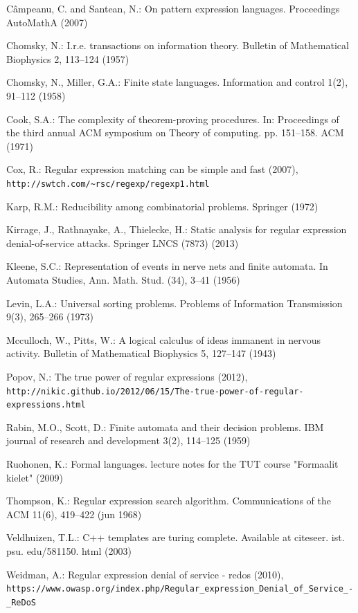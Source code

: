 \documentclass{llncs}
\begin{document}
\begin{thebibliography}{10}
\providecommand{\url}[1]{\texttt{#1}}
\providecommand{\urlprefix}{URL }

C{\^a}mpeanu, C. and Santean, N.: On pattern expression languages. 
  Proceedings AutoMathA (2007)

Chomsky, N.: I.r.e. transactions on information theory. Bulletin of
  Mathematical Biophysics  2,  113--124 (1957)

Chomsky, N., Miller, G.A.: Finite state languages. Information and control
  1(2),  91--112 (1958)

Cook, S.A.: The complexity of theorem-proving procedures. In: Proceedings of
  the third annual ACM symposium on Theory of computing. pp. 151--158. ACM
  (1971)

Cox, R.: Regular expression matching can be simple and fast (2007),
  \url{http://swtch.com/\textasciitilde{}rsc/regexp/regexp1.html}

Karp, R.M.: Reducibility among combinatorial problems. Springer (1972)

Kirrage, J., Rathnayake, A., Thielecke, H.: Static analysis for regular
  expression denial-of-service attacks. Springer LNCS (7873) (2013)

Kleene, S.C.: Representation of events in nerve nets and finite automata. In
  Automata Studies, Ann. Math. Stud. (34),  3--41 (1956)

Levin, L.A.: Universal sorting problems. Problems of Information Transmission
  9(3),  265--266 (1973)

Mcculloch, W., Pitts, W.: A logical calculus of ideas immanent in nervous
  activity. Bulletin of Mathematical Biophysics  5,  127--147 (1943)

Popov, N.: The true power of regular expressions (2012),
  \url{http://nikic.github.io/2012/06/15/The-true-power-of-regular-expressions.html}

Rabin, M.O., Scott, D.: Finite automata and their decision problems. IBM
  journal of research and development  3(2),  114--125 (1959)

Ruohonen, K.: Formal languages. lecture notes for the TUT course "Formaalit
  kielet"  (2009)

Thompson, K.: Regular expression search algorithm. Communications of the ACM
  11(6),  419--422 (jun 1968)

Veldhuizen, T.L.: C++ templates are turing complete. Available at citeseer.
  ist. psu. edu/581150. html  (2003)

Weidman, A.: Regular expression denial of service - redos (2010),
  \url{https://www.owasp.org/index.php/Regular\_expression\_Denial\_of\_Service\_-\_ReDoS}

\end{thebibliography}
\end{document}
